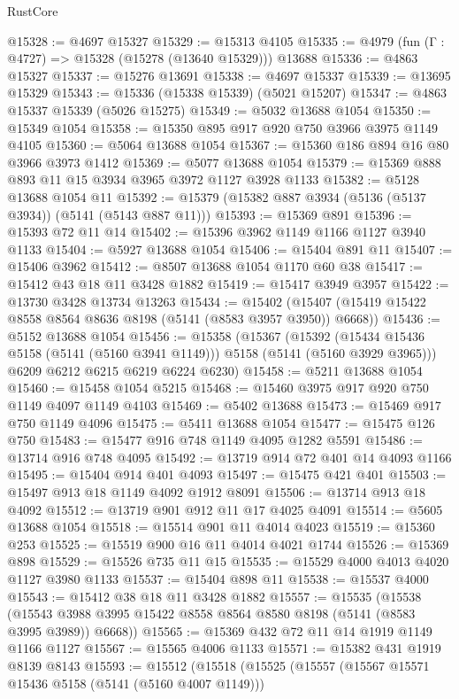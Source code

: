 \begin{lexlean}{RustCore}
\begin{coremodule}
@15328 := @4697 @15327
@15329 := @15313 @4105
@15335 := @4979 (fun (Γ : @4727) => @15328 (@15278 (@13640 @15329))) @13688
@15336 := @4863 @15327
@15337 := @15276 @13691
@15338 := @4697 @15337
@15339 := @13695 @15329
@15343 := @15336 (@15338 @15339) (@5021 @15207)
@15347 := @4863 @15337 @15339 (@5026 @15275)
@15349 := @5032 @13688 @1054
@15350 := @15349 @1054
@15358 := @15350 @895 @917 @920 @750 @3966 @3975 @1149 @4105
@15360 := @5064 @13688 @1054
@15367 := @15360 @186 @894 @16 @80 @3966 @3973 @1412
@15369 := @5077 @13688 @1054
@15379 := @15369 @888 @893 @11 @15 @3934 @3965 @3972 @1127 @3928 @1133
@15382 := @5128 @13688 @1054 @11
@15392 := @15379 (@15382 @887 @3934 (@5136 (@5137 @3934)) (@5141 (@5143 @887 @11)))
@15393 := @15369 @891
@15396 := @15393 @72 @11 @14
@15402 := @15396 @3962 @1149 @1166 @1127 @3940 @1133
@15404 := @5927 @13688 @1054
@15406 := @15404 @891 @11
@15407 := @15406 @3962
@15412 := @8507 @13688 @1054 @1170 @60 @38
@15417 := @15412 @43 @18 @11 @3428 @1882
@15419 := @15417 @3949 @3957
@15422 := @13730 @3428 @13734 @13263
@15434 := @15402 (@15407 (@15419 @15422 @8558 @8564 @8636 @8198 (@5141 (@8583 @3957 @3950)) @6668))
@15436 := @5152 @13688 @1054
@15456 := @15358
    (@15367
      (@15392 (@15434 @15436 @5158 (@5141 (@5160 @3941 @1149))) @5158 (@5141 (@5160 @3929 @3965)))
      @6209
      @6212
      @6215
      @6219
      @6224
      @6230)
@15458 := @5211 @13688 @1054
@15460 := @15458 @1054 @5215
@15468 := @15460 @3975 @917 @920 @750 @1149 @4097 @1149 @4103
@15469 := @5402 @13688
@15473 := @15469 @917 @750 @1149 @4096
@15475 := @5411 @13688 @1054
@15477 := @15475 @126 @750
@15483 := @15477 @916 @748 @1149 @4095 @1282 @5591
@15486 := @13714 @916 @748 @4095
@15492 := @13719 @914 @72 @401 @14 @4093 @1166
@15495 := @15404 @914 @401 @4093
@15497 := @15475 @421 @401
@15503 := @15497 @913 @18 @1149 @4092 @1912 @8091
@15506 := @13714 @913 @18 @4092
@15512 := @13719 @901 @912 @11 @17 @4025 @4091
@15514 := @5605 @13688 @1054
@15518 := @15514 @901 @11 @4014 @4023
@15519 := @15360 @253
@15525 := @15519 @900 @16 @11 @4014 @4021 @1744
@15526 := @15369 @898
@15529 := @15526 @735 @11 @15
@15535 := @15529 @4000 @4013 @4020 @1127 @3980 @1133
@15537 := @15404 @898 @11
@15538 := @15537 @4000
@15543 := @15412 @38 @18 @11 @3428 @1882
@15557 := @15535
    (@15538 (@15543 @3988 @3995 @15422 @8558 @8564 @8580 @8198 (@5141 (@8583 @3995 @3989)) @6668))
@15565 := @15369 @432 @72 @11 @14 @1919 @1149 @1166 @1127
@15567 := @15565 @4006 @1133
@15571 := @15382 @431 @1919 @8139 @8143
@15593 := @15512
    (@15518
      (@15525
        (@15557
          (@15567 @15571 @15436 @5158 (@5141 (@5160 @4007 @1149)))

\end{coremodule}
\end{lexlean}
